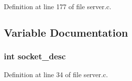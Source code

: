 Definition at line 177 of file server.\-c.



\subsection{Variable Documentation}
\subsubsection[{socket\-\_\-desc}]{\setlength{\rightskip}{0pt plus 5cm}int socket\-\_\-desc}\label{server_8c_adeadf7cb6916a10c7142ce7d265ab32a}


Definition at line 34 of file server.\-c.

